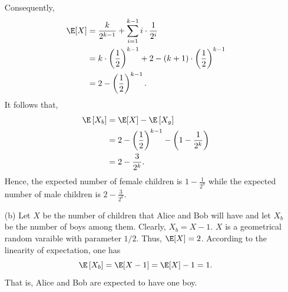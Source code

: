 \begin{enumerate}
\begin{align*}
  \end{align*}
  Consequently,
  \begin{align*}
    \E[X]
      &= \frac{k}{2^{k-1}} + \sum_{i = 1}^{k-1} i \cdot \frac{1}{2^{i}} \\
      &= k \cdot \left(\frac{1}{2}\right)^{k-1} + 2 - \left( k + 1 \right) \cdot \left(\frac{1}{2}\right)^{k-1} \\
      &= 2 - \left(\frac{1}{2}\right)^{k-1}.
  \end{align*}
  It follows that,
  \begin{align*}
    \E\left[X_b\right]
      &= \E[X] - \E\left[X_g\right] \\
      &= 2 - \left(\frac{1}{2}\right)^{k-1} - \left( 1 - \frac{1}{2^k} \right) \\
      &= 2 - \frac{3}{2^k}.
  \end{align*}
  Hence, the expected number of female children is $1 - \frac{1}{2^k}$ while the
  expected number of male children is $2 - \frac{3}{2^k}$.

  \item[(b)] Let $X$ be the number of children that Alice and Bob will have and
  let $X_b$ be the number of boys among them. Clearly, $X_b = X - 1$. $X$ is a
  geometrical random varaible with parameter $1/2$. Thus, $\E[X] = 2$.
  According to the linearity of expectation, one has
  \[
    \E\left[X_b\right] = \E[X - 1] = \E[X] - 1 = 1.
  \]
  That is, Alice and Bob are expected to have one boy.
\end{enumerate}
